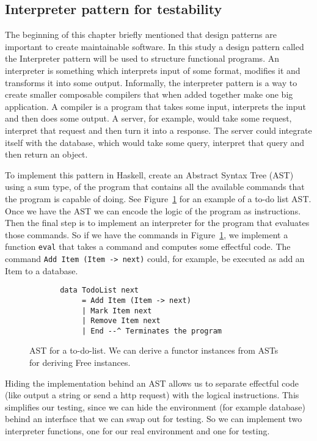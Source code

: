 \subsection{Interpreter pattern for testability}\label{interpreterpattern}

The beginning of this chapter briefly mentioned that design patterns are
important to create maintainable software.  In this study a design pattern
called the Interpreter pattern will be used to structure functional programs. An
interpreter is something which interprets input of some format, modifies it and
transforms it into some output.  Informally, the interpreter pattern is a way to
create smaller composable compilers that when added together make one big
application. A compiler is a program that takes some input, interprets the input
and then does some output. A server, for example, would take some request,
interpret that request and then turn it into a response. The server could
integrate itself with the database, which would take some query, interpret that
query and then return an object.~\cite{interpreterpattern}

To implement this pattern in Haskell, create an Abstract Syntax Tree (AST) using
a sum type, of the program that contains all the available commands that the
program is capable of doing. See Figure~\ref{freeunion} for an example of a
to-do list AST. Once we have the AST we can encode the logic of the program as
instructions. Then the final step is to implement an interpreter for the program
that evaluates those commands. So if we have the commands in
Figure~\ref{freeunion}, we implement a function \texttt{eval} that takes a
command and computes some effectful code.  The command \texttt{Add Item (Item ->
next)} could, for example, be executed as add an Item to a database.

\begin{figure}[H]
    \begin{lstlisting}
       data TodoList next
            = Add Item (Item -> next)
            | Mark Item next
            | Remove Item next
            | End --^ Terminates the program
    \end{lstlisting}
    \caption{AST for a to-do-list. We can derive a functor instances
    from ASTs for deriving Free instances.~\cite{commentarycompiler}}
    \label{freeunion}
\end{figure}


Hiding the implementation behind an AST allows us to separate effectful code
(like output a string or send a http request) with the logical instructions.
This simplifies our testing, since we can hide the environment (for example
database) behind an interface that we can swap out for testing. So we can
implement two interpreter functions, one for our real environment and one for
testing. 

